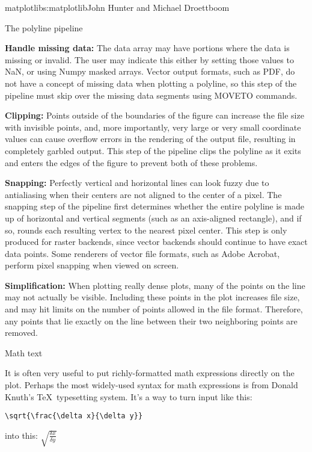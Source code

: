 \begin{aosachapter}{matplotlib}{s:matplotlib}{John Hunter and Michael Droettboom}
\begin{aosasect1}{The polyline pipeline}
\begin{aosaenumerate}
\item \textbf{Handle missing data:} The data array may have portions
  where the data is missing or invalid.  The user may indicate this
  either by setting those values to NaN, or using Numpy masked arrays.
  Vector output formats, such as PDF, do not have a concept of missing
  data when plotting a polyline, so this step of the pipeline must
  skip over the missing data segments using MOVETO commands.

\item \textbf{Clipping:} Points outside of the boundaries of the
  figure can increase the file size with invisible points, and, more
  importantly, very large or very small coordinate values can cause
  overflow errors in the rendering of the output file, resulting in
  completely garbled output.  This step of the pipeline clips the
  polyline as it exits and enters the edges of the figure to prevent
  both of these problems.

\item \textbf{Snapping:} Perfectly vertical and horizontal lines can
  look fuzzy due to antialiasing when their centers are not aligned to
  the center of a pixel.  The snapping step of the pipeline first
  determines whether the entire polyline is made up of horizontal and
  vertical segments (such as an axis-aligned rectangle), and if so,
  rounds each resulting vertex to the nearest pixel center.  This step
  is only produced for raster backends, since vector backends should
  continue to have exact data points.  Some renderers of vector file
  formats, such as Adobe Acrobat, perform pixel snapping when viewed
  on screen.

\item \textbf{Simplification:} When plotting really dense plots, many
  of the points on the line may not actually be visible.  Including
  these points in the plot increases file size, and may hit limits on
  the number of points allowed in the file format.  Therefore, any
  points that lie exactly on the line between their two neighboring
  points are removed.

\end{aosaenumerate}


\end{aosasect1}

\begin{aosasect1}{Math text}

It is often very useful to put richly-formatted math expressions
directly on the plot.  Perhaps the most widely-used syntax for math
expressions is from Donald Knuth's \TeX\ typesetting system.  It's a
way to turn input like this:
\begin{verbatim}
\sqrt{\frac{\delta x}{\delta y}}
\end{verbatim}
into this:
\begin{math}
\sqrt{\frac{\delta x}{\delta y}}
\end{math}


\end{aosasect1}
\end{aosachapter}

